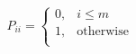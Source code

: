 \documentclass[10pt]{article}
\begin{document}
\begin{align*}P_{ii} = \begin{cases}
0, & i \le m \\
1, & \textrm{otherwise} \\
\end{cases}\end{align*}
\end{document}
